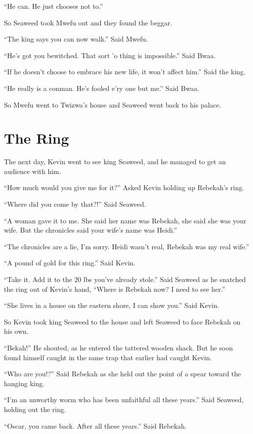 ``He can. He just chooses not to.''

So Seaweed took Mwefu out and they found the beggar.

``The king says you can now walk.'' Said Mwefu.

``He's got you bewitched. That sort 'o thing is impossible.'' Said Bwaa.

``If he doesn't choose to embrace his new life, it won't affect him.'' Said the king.

``He really is a conman. He's fooled e'ry one but me.'' Said Bwaa.

So Mwefu went to Twizwa's house and Seaweed went back to his palace.


\section{The Ring}
The next day, Kevin went to see king Seaweed, and he managed to get an audience with him.

``How much would you give me for it?'' Asked Kevin holding up Rebekah's ring.

``Where did you come by that?!'' Said Seaweed.

``A woman gave it to me. She said her name was Rebekah, she said she was your wife. But the chronicles said your wife's name was Heidi.''

``The chronicles are a lie, I'm sorry. Heidi wasn't real, Rebekah was my real wife.''

``A pound of gold for this ring.'' Said Kevin.

``Take it. Add it to the 20 lbs you've already stole.'' Said Seaweed as he snatched the ring out of Kevin's hand, ``Where is Rebekah now? I need to see her.''

``She lives in a house on the eastern shore, I can show you.'' Said Kevin.

So Kevin took king Seaweed to the house and left Seaweed to face Rebekah on his own.

``Bekah!'' He shouted, as he entered the tattered wooden shack. But he soon found himself caught in the same trap that earlier had caught Kevin.

``Who are you!?'' Said Rebekah as she held out the point of a spear toward the hanging king.

``I'm an unworthy worm who has been unfaithful all these years.'' Said Seaweed, holding out the ring.

``Oscar, you came back. After all these years.'' Said Rebekah.

